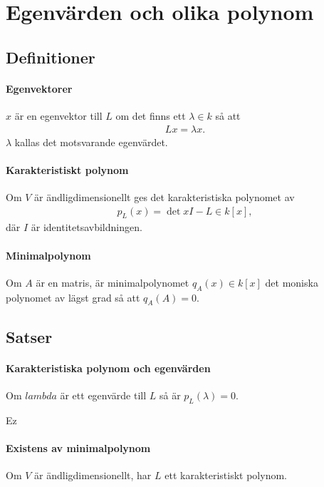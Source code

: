 \section{Egenvärden och olika polynom}

\subsection{Definitioner}

\paragraph{Egenvektorer}
$x$ är en egenvektor till $L$ om det finns ett $\lambda\in k$ så att
\begin{align*}
	Lx = \lambda x.
\end{align*}
$\lambda$ kallas det motsvarande egenvärdet.

\paragraph{Karakteristiskt polynom}
Om $V$ är ändligdimensionellt ges det karakteristiska polynomet av
\begin{align*}
	p_{L}(x) = \det{xI - L}\in k[x],
\end{align*}
där $I$ är identitetsavbildningen.

\paragraph{Minimalpolynom}
Om $A$ är en matris, är minimalpolynomet $q_{A}(x)\in k[x]$ det moniska polynomet av lägst grad så att $q_{A}(A) = 0$.

\subsection{Satser}

\paragraph{Karakteristiska polynom och egenvärden}
Om $lambda$ är ett egenvärde till $L$ så är $p_{L}(\lambda) = 0$.

\proof
Ez

\paragraph{Existens av minimalpolynom}
Om $V$ är ändligdimensionellt, har $L$ ett karakteristiskt polynom.

